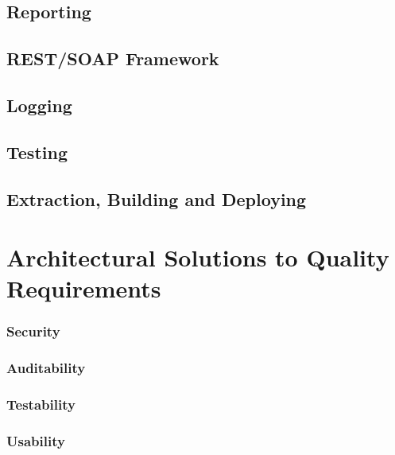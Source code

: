 \documentclass[12pt]{article}
\begin{document}
                    \subsection{Reporting}
                    \subsection{REST/SOAP Framework}
                    
                    \subsection{Logging}
                    
                    \subsection{Testing}
                    
                    \subsection{Extraction, Building and Deploying}
                    
               \section{Architectural Solutions to Quality Requirements}
               
               		\subsubsection{Security }
                   	\subsubsection{Auditability}

                  	\subsubsection{Testability}
                  	
                  	\subsubsection{Usability}
                  	
\end{document}
